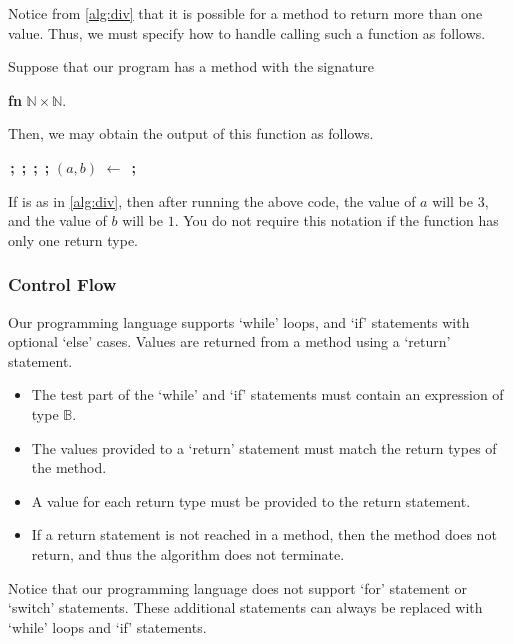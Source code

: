 \documentclass[11pt,a4paper,reqno]{amsart}
\makeatletter
\newcommand{\algorithmstyle}[1]{\renewcommand{\algocf@style}{#1}}
\newcommand{\Assign}[2]{\Let{#1 $\gets$ #2}}
\newcommand{\Reassign}[2]{#1 $\gets$ #2}
\newcommand{\EOL}{\,\textbf{;}\;}
\theoremstyle{plain}
\theoremstyle{definition}
\theoremstyle{definition}
\makeatother
\begin{document}
Notice from \cref{alg:div} that it is possible for a method to return more than one value.
Thus, we must specify how to handle calling such a function as follows.

Suppose that our program has a method with the signature
\begin{center}
  \textbf{fn}  $\mathbb N\times \mathbb N$.
\end{center}
Then, we may obtain the output of this function as follows.

\begin{algorithm}[H]
  \Assign{$x\colon \mathbb N$}{$10$}\EOL
  \Assign{$y\colon \mathbb N$}{$3$}\EOL
  \Assign{$a\colon \mathbb N$}{$0$}\EOL
  \Assign{$b\colon \mathbb N$}{$0$}\EOL
  \Reassign{$(a,b)$}{}\EOL
\end{algorithm}

\noindent
If \divideFn is as in \cref{alg:div}, then after running the above code, the value of $a$ will be 3, and the value of $b$ will be $1$.
You do not require this notation if the function has only one return type.

\algorithmstyle{ruled}

\subsubsection{Control Flow}

Our programming language supports `while' loops, and `if' statements with optional `else' cases.
Values are returned from a method using a `return' statement.

\begin{itemize}
  \item The test part of the `while' and `if' statements must contain an expression of type $\mathbb B$.
  \item The values provided to a `return' statement must match the return types of the method.
  \item A value for each return type must be provided to the return statement.
  \item If a return statement is not reached in a method, then the method does not return, and thus the algorithm does not terminate.
\end{itemize}

\noindent
Notice that our programming language does not support `for' statement or `switch' statements.
These additional statements can always be replaced with `while' loops and `if' statements.
\end{document}
